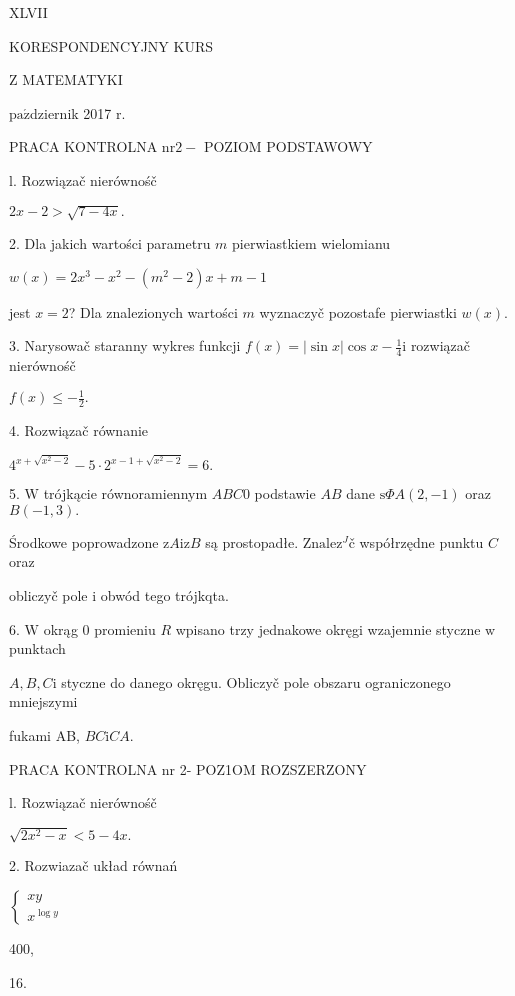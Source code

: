 \documentclass[a4paper,12pt]{article}
\begin{document}
XLVII

KORESPONDENCYJNY KURS

Z MATEMATYKI

$\mathrm{p}\mathrm{a}\acute{\mathrm{z}}$dziernik 2017 $\mathrm{r}.$

PRACA KONTROLNA $\mathrm{n}\mathrm{r} 2-$ POZIOM PODSTAWOWY

l. Rozwiązač nierównośč

$2x-2>\sqrt{7-4x}.$

2. Dla jakich wartości parametru $m$ pierwiastkiem wielomianu

$w(x)=2x^{3}-x^{2}-(m^{2}-2)x+m-1$

jest $x=2$? Dla znalezionych wartości $m$ wyznaczyč pozostafe pierwiastki $w(x).$

3. Narysowač staranny wykres funkcji $f(x)=|\displaystyle \sin x|\cos x-\frac{1}{4}\mathrm{i}$ rozwiązač nierównośč

$f(x)\displaystyle \leq-\frac{1}{2}.$

4. Rozwiązač równanie

$4^{x+\sqrt{x^{2}-2}}-5\cdot 2^{x-1+\sqrt{x^{2}-2}}=6.$

5. $\mathrm{W}$ trójkącie równoramiennym $ABC0$ podstawie $AB$ dane $\mathrm{s}\Phi A(2,-1)$ oraz $B(-1,3).$

Środkowe poprowadzone $\mathrm{z}A\mathrm{i}\mathrm{z}B$ są prostopadłe. $\mathrm{Z}\mathrm{n}\mathrm{a}\mathrm{l}\mathrm{e}\mathrm{z}^{J}\text{č}$ współrzędne punktu $C$ oraz

obliczyč pole $\mathrm{i}$ obwód tego trójkqta.

6. $\mathrm{W}$ okrąg $0$ promieniu $R$ wpisano trzy jednakowe okręgi wzajemnie styczne $\mathrm{w}$ punktach

$A, B, C\mathrm{i}$ styczne do danego okręgu. Obliczyč pole obszaru ograniczonego mniejszymi

fukami AB, $BC\mathrm{i}CA.$




PRACA KONTROLNA nr 2- POZ1OM ROZSZERZONY

l. Rozwiązač nierównośč

$\sqrt{2x^{2}-x}<5-4x.$

2. Rozwiazač układ równań

$\left\{\begin{array}{l}
xy\\
x^{\log y}
\end{array}\right.$

400,

16.
\end{document}
